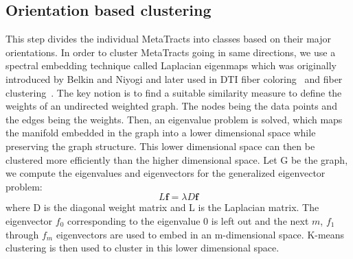 \subsection {Orientation based clustering}
This step divides the individual MetaTracts into classes based on their major orientations. In order to cluster MetaTracts going in same directions, we use a spectral embedding technique called Laplacian eigenmaps which was originally introduced by Belkin and Niyogi \cite{Belkin01} and later used in DTI fiber coloring~\cite{Brun2003} and fiber clustering~\cite{Brun2004}. The key notion is to find a suitable similarity measure to define the weights of an undirected weighted graph. The nodes being the data points and the edges being the weights. Then, an eigenvalue problem is solved, which maps the manifold embedded in the graph into a lower dimensional space while preserving the graph structure.
This lower dimensional space can then be clustered more efficiently than the higher dimensional space. 
Let G be the graph, we compute the eigenvalues and eigenvectors for the generalized eigenvector problem:
\begin{equation}\label{equn:eigenMaps}
L\textbf{f}=\lambda D\textbf{f}
\end{equation}
where D is the diagonal weight matrix and L is the Laplacian matrix. The eigenvector \textbf{${f}_{0}$} corresponding to the eigenvalue 0 is left out and the next $m$, {\textbf{${f}_{1}$} through \textbf{${f}_{m}$}} eigenvectors are used to embed in an m-dimensional space. K-means clustering is then used to cluster in this lower dimensional space.

